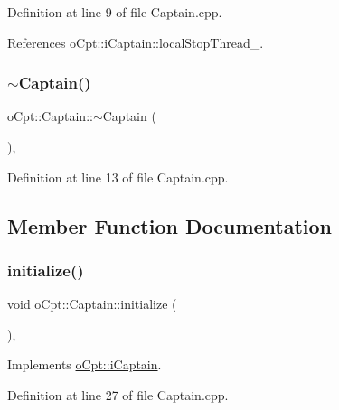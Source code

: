 Definition at line 9 of file Captain.\+cpp.



References o\+Cpt\+::i\+Captain\+::local\+Stop\+Thread\+\_\+.

\hypertarget{classo_cpt_1_1_captain_ae78194ab847c6fbf3fae7f3d92f02f70}{}\label{classo_cpt_1_1_captain_ae78194ab847c6fbf3fae7f3d92f02f70} 
\subsubsection{\texorpdfstring{$\sim$\+Captain()}{~Captain()}}
{\footnotesize\ttfamily o\+Cpt\+::\+Captain\+::$\sim$\+Captain (\begin{DoxyParamCaption}{ }\end{DoxyParamCaption})\hspace{0.3cm}{\ttfamily [override]}, {\ttfamily [virtual]}}



Definition at line 13 of file Captain.\+cpp.



\subsection{Member Function Documentation}
\hypertarget{classo_cpt_1_1_captain_a3afce8b5a16b91a8b848ab6ae12a5ca6}{}\label{classo_cpt_1_1_captain_a3afce8b5a16b91a8b848ab6ae12a5ca6} 
\subsubsection{\texorpdfstring{initialize()}{initialize()}}
{\footnotesize\ttfamily void o\+Cpt\+::\+Captain\+::initialize (\begin{DoxyParamCaption}{ }\end{DoxyParamCaption})\hspace{0.3cm}{\ttfamily [override]}, {\ttfamily [virtual]}}



Implements \hyperlink{classo_cpt_1_1i_captain_a5ad7947dde7866981c76ccd3a30ce4ce}{o\+Cpt\+::i\+Captain}.



Definition at line 27 of file Captain.\+cpp.

